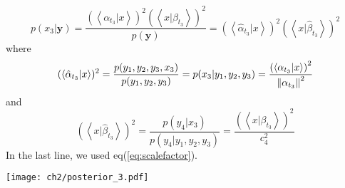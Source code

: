 \begin{definition}[$p(x_3|\textbf{y})$]
\begin{equation}
        p(x_3|\textbf{y}) = \frac{(\left<\alpha_{t_{3}}|x \right>)^2 (\left<x|\beta_{t_{3}} \right>)^2 }{p(\textbf{y})} 
        = (\left<\hat{\alpha}_{t_{3}}|x \right>)^2 \left(\left<x|\hat{\beta}_{t_{3}} \right>\right)^2
\end{equation}
where
\begin{equation}
        (\left<\hat{\alpha}_{t_{3}}|x \right>)^2 = 
        \frac{p(y_1,y_2,y_3, x_3)}{p(y_1,y_2,y_3)} =
        p(x_3|y_1,y_2,y_3)=
        \frac{\left(\left< \alpha_{t_3} | x \right>\right)^2}{\left\lVert\alpha_{t_3}\right\rVert^2}   
\end{equation}
and
\begin{equation}
        \left(\left<x|\hat{\beta}_{t_{3}} \right>\right)^2 = \frac{p(y_4|x_3)}{p(y_4|y_1,y_2,y_3)} 
        =  \frac{ (\left<x|\beta_{t_{3}} \right>)^2 }{ c_4^2 }
\end{equation}
In the last line, we used eq(\ref{eq:scalefactor}).
\begin{center}
        \texttt{[image: ch2/posterior\_3.pdf]}
\end{center}   
\end{definition}